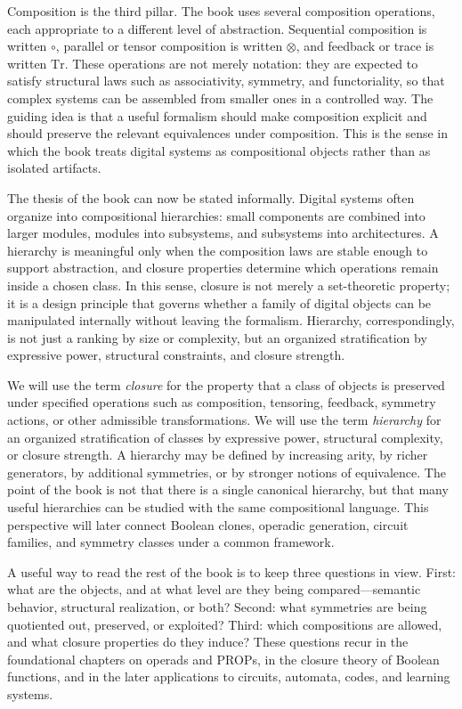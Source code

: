 \documentclass[11pt]{article}
\begin{document}
Composition is the third pillar. The book uses several composition operations, each appropriate to a different level of abstraction. Sequential composition is written \(\circ\), parallel or tensor composition is written \(\otimes\), and feedback or trace is written \(\mathrm{Tr}\). These operations are not merely notation: they are expected to satisfy structural laws such as associativity, symmetry, and functoriality, so that complex systems can be assembled from smaller ones in a controlled way. The guiding idea is that a useful formalism should make composition explicit and should preserve the relevant equivalences under composition. This is the sense in which the book treats digital systems as compositional objects rather than as isolated artifacts.

The thesis of the book can now be stated informally. Digital systems often organize into compositional hierarchies: small components are combined into larger modules, modules into subsystems, and subsystems into architectures. A hierarchy is meaningful only when the composition laws are stable enough to support abstraction, and closure properties determine which operations remain inside a chosen class. In this sense, closure is not merely a set-theoretic property; it is a design principle that governs whether a family of digital objects can be manipulated internally without leaving the formalism. Hierarchy, correspondingly, is not just a ranking by size or complexity, but an organized stratification by expressive power, structural constraints, and closure strength.

We will use the term \emph{closure} for the property that a class of objects is preserved under specified operations such as composition, tensoring, feedback, symmetry actions, or other admissible transformations. We will use the term \emph{hierarchy} for an organized stratification of classes by expressive power, structural complexity, or closure strength. A hierarchy may be defined by increasing arity, by richer generators, by additional symmetries, or by stronger notions of equivalence. The point of the book is not that there is a single canonical hierarchy, but that many useful hierarchies can be studied with the same compositional language. This perspective will later connect Boolean clones, operadic generation, circuit families, and symmetry classes under a common framework.

A useful way to read the rest of the book is to keep three questions in view. First: what are the objects, and at what level are they being compared---semantic behavior, structural realization, or both? Second: what symmetries are being quotiented out, preserved, or exploited? Third: which compositions are allowed, and what closure properties do they induce? These questions recur in the foundational chapters on operads and PROPs, in the closure theory of Boolean functions, and in the later applications to circuits, automata, codes, and learning systems.
\end{document}
